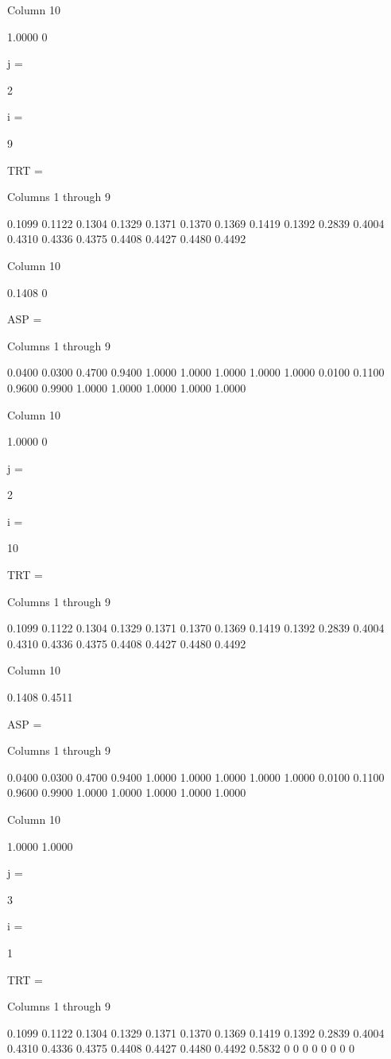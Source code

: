   Column 10

    1.0000
         0


j =

     2


i =

     9


TRT =

  Columns 1 through 9

    0.1099    0.1122    0.1304    0.1329    0.1371    0.1370    0.1369    0.1419    0.1392
    0.2839    0.4004    0.4310    0.4336    0.4375    0.4408    0.4427    0.4480    0.4492

  Column 10

    0.1408
         0


ASP =

  Columns 1 through 9

    0.0400    0.0300    0.4700    0.9400    1.0000    1.0000    1.0000    1.0000    1.0000
    0.0100    0.1100    0.9600    0.9900    1.0000    1.0000    1.0000    1.0000    1.0000

  Column 10

    1.0000
         0


j =

     2


i =

    10


TRT =

  Columns 1 through 9

    0.1099    0.1122    0.1304    0.1329    0.1371    0.1370    0.1369    0.1419    0.1392
    0.2839    0.4004    0.4310    0.4336    0.4375    0.4408    0.4427    0.4480    0.4492

  Column 10

    0.1408
    0.4511


ASP =

  Columns 1 through 9

    0.0400    0.0300    0.4700    0.9400    1.0000    1.0000    1.0000    1.0000    1.0000
    0.0100    0.1100    0.9600    0.9900    1.0000    1.0000    1.0000    1.0000    1.0000

  Column 10

    1.0000
    1.0000


j =

     3


i =

     1


TRT =

  Columns 1 through 9

    0.1099    0.1122    0.1304    0.1329    0.1371    0.1370    0.1369    0.1419    0.1392
    0.2839    0.4004    0.4310    0.4336    0.4375    0.4408    0.4427    0.4480    0.4492
    0.5832         0         0         0         0         0         0         0         0

